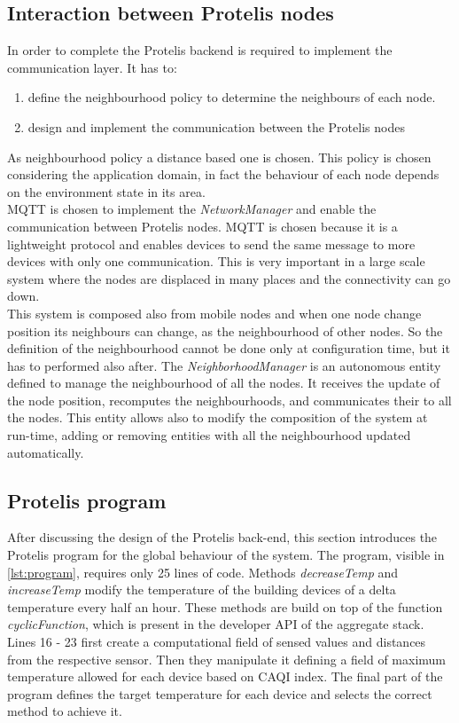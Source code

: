 \subsection*{Interaction between Protelis nodes}
In order to complete the Protelis backend is required to implement the communication layer. It has to:
\begin{enumerate}
    \item define the neighbourhood policy to determine the neighbours of each node.
    \item design and implement the communication between the Protelis nodes
\end{enumerate}
As neighbourhood policy a distance based one is chosen. 
This policy is chosen considering the application domain, in fact the behaviour of each node depends on the environment state in its area.\\ 
MQTT is chosen to implement the \mbox{\textit{NetworkManager}} and enable the communication between Protelis nodes.
MQTT is chosen because it is a lightweight protocol and enables devices to send the same message to more devices with only one communication.
This is very important in a large scale system where the nodes are displaced in many places and the connectivity can go down. \\
This system is composed also from mobile nodes and when one node change position its neighbours can change, as the neighbourhood of other nodes. 
So the definition of the neighbourhood cannot be done only at configuration time, but it has to performed also after.
The \mbox{\textit{NeighborhoodManager}} is an autonomous entity defined to manage the neighbourhood of all the nodes.
It receives the update of the node position, recomputes the neighbourhoods, and communicates their to all the nodes. 
This entity allows also to modify the composition of the system at run-time, adding or removing entities with all the neighbourhood updated automatically.

\subsection{Protelis program}
After discussing the design of the Protelis back-end, this section introduces the Protelis program for the global behaviour of the system. 
The program, visible in \autoref{lst:program}, requires only 25 lines of code.
Methods \mbox{\textit{decreaseTemp}} and \mbox{\textit{increaseTemp}} modify the temperature of the building devices of a delta temperature every half an hour.
These methods are build on top of the function \mbox{\textit{cyclicFunction}}, which is present in the developer API of the aggregate stack.
Lines 16 - 23 first create a computational field of sensed values and distances from the respective sensor. 
Then they manipulate it defining a field of maximum temperature allowed for each device based on CAQI index.
The final part of the program defines the target temperature for each device and selects the correct method to achieve it. 

